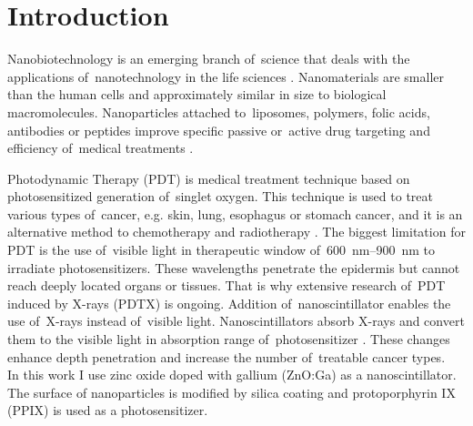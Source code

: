 
\section{Introduction}
\label{s:introduction}

Nanobiotechnology is an emerging branch of~science that deals with the applications of~nanotechnology in the life sciences \cite{jain10}. Nanomaterials are smaller than the human cells and approximately similar in size to biological macromolecules. Nanoparticles attached to~liposomes, polymers, folic acids, antibodies or peptides improve specific passive or~active drug targeting and efficiency of~medical treatments \cite{lammers08}.   
 
Photodynamic Therapy (PDT) is medical treatment technique based on  photosensitized generation of~singlet oxygen. This technique is used to treat various types of~cancer, e.g. skin, lung, esophagus or stomach cancer, and it is an alternative method to chemotherapy and radiotherapy \cite{rollakanti15,takahashi09}. The biggest limitation for PDT is the use of~visible light in therapeutic window of~\SIrange{600}{900}{nm} to irradiate photosensitizers. These wavelengths penetrate the epidermis but cannot reach deeply located organs or tissues. That is why extensive research of~PDT induced by X-rays (PDTX) is ongoing. Addition of~nanoscintillator enables the use of~X-rays instead of~visible light. Nanoscintillators absorb X-rays and convert them to the visible light in absorption range of~photosensitizer \cite{jary13,chen15}. These changes enhance depth penetration and increase the number of~treatable cancer types. \\

In this work I use zinc oxide doped with gallium (ZnO:Ga) as a nanoscintillator. The surface of nanoparticles is modified by silica coating and protoporphyrin IX (PPIX) is used as a photosensitizer. 
